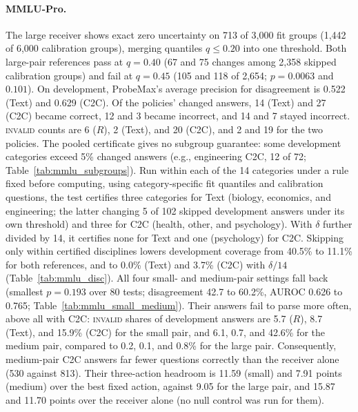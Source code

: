 \paragraph{MMLU-Pro.}\label{app:mmlu} The large receiver shows exact zero uncertainty on 713 of 3,000 fit groups (1,442 of 6,000 calibration groups), merging quantiles $q\le0.20$ into one threshold. Both large-pair references pass at $q=0.40$ (67 and 75 changes among 2,358 skipped calibration groups) and fail at $q=0.45$ (105 and 118 of 2,654; $p=0.0063$ and $0.101$). On development, ProbeMax's average precision for disagreement is 0.522 (Text) and 0.629 (C2C). Of the policies' changed answers, 14 (Text) and 27 (C2C) became correct, 12 and 3 became incorrect, and 14 and 7 stayed incorrect. \textsc{invalid} counts are 6 ($R$), 2 (Text), and 20 (C2C), and 2 and 19 for the two policies. The pooled certificate gives no subgroup guarantee: some development categories exceed 5\% changed answers (e.g., engineering C2C, 12 of 72; Table~\ref{tab:mmlu_subgroups}). Run within each of the 14 categories under a rule fixed before computing, using category-specific fit quantiles and calibration questions, the test certifies three categories for Text (biology, economics, and engineering; the latter changing 5 of 102 skipped development answers under its own threshold) and three for C2C (health, other, and psychology). With $\delta$ further divided by 14, it certifies none for Text and one (psychology) for C2C. Skipping only within certified disciplines lowers development coverage from 40.5\% to 11.1\% for both references, and to 0.0\% (Text) and 3.7\% (C2C) with $\delta/14$ (Table~\ref{tab:mmlu_disc}). All four small- and medium-pair settings fall back (smallest $p=0.193$ over 80 tests; disagreement 42.7 to 60.2\%, AUROC 0.626 to 0.765; Table~\ref{tab:mmlu_small_medium}). Their answers fail to parse more often, above all with C2C: \textsc{invalid} shares of development answers are 5.7 ($R$), 8.7 (Text), and 15.9\% (C2C) for the small pair, and 6.1, 0.7, and 42.6\% for the medium pair, compared to 0.2, 0.1, and 0.8\% for the large pair. Consequently, medium-pair C2C answers far fewer questions correctly than the receiver alone (530 against 813). Their three-action headroom is 11.59 (small) and 7.91 points (medium) over the best fixed action, against 9.05 for the large pair, and 15.87 and 11.70 points over the receiver alone (no null control was run for them).

